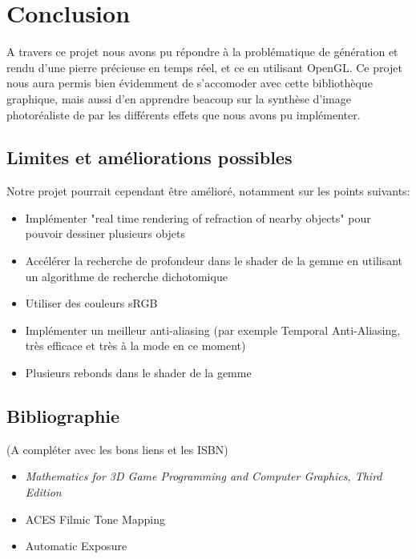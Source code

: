 \documentclass[a4paper,12pt]{article}
\begin{document}
\section{Conclusion}
A travers ce projet nous avons pu répondre à la problématique de génération et rendu d'une
pierre précieuse en temps réel, et ce en utilisant OpenGL. Ce projet nous aura permis bien
évidemment de s'accomoder avec cette bibliothèque graphique, mais aussi d'en apprendre beacoup
sur la synthèse d'image photoréaliste de par les différents effets que nous avons pu implémenter.

\subsection{Limites et améliorations possibles}
Notre projet pourrait cependant être amélioré, notamment sur les points suivants:
\begin{itemize}
    \item Implémenter "real time rendering of refraction of nearby objects" pour pouvoir dessiner plusieurs objets
    \item Accélérer la recherche de profondeur dans le shader de la gemme en utilisant un algorithme de recherche dichotomique
    \item Utiliser des couleurs sRGB
    \item Implémenter un meilleur anti-aliasing (par exemple Temporal Anti-Aliasing, très efficace et très à la mode en ce moment)
    \item Plusieurs rebonds dans le shader de la gemme
\end{itemize}

\subsection{Bibliographie}
(A compléter avec les bons liens et les ISBN)
\begin{itemize}
    \item \emph{Mathematics for 3D Game Programming and Computer Graphics, Third Edition}
    \item ACES Filmic Tone Mapping
    \item Automatic Exposure
\end{itemize}
\end{document}
